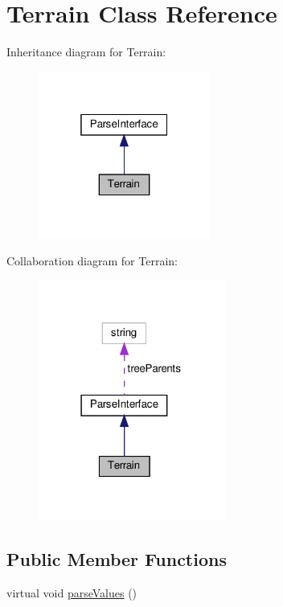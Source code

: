 \hypertarget{classTerrain}{}\section{Terrain Class Reference}
\label{classTerrain}


Inheritance diagram for Terrain\+:
\nopagebreak
\begin{figure}[H]
\begin{center}
\leavevmode
\includegraphics[width=160pt]{classTerrain__inherit__graph}
\end{center}
\end{figure}


Collaboration diagram for Terrain\+:
\nopagebreak
\begin{figure}[H]
\begin{center}
\leavevmode
\includegraphics[width=174pt]{classTerrain__coll__graph}
\end{center}
\end{figure}
\subsection*{Public Member Functions}
\begin{DoxyCompactItemize}
\item 
virtual void \hyperlink{classTerrain_a4258f6f5195a3be6c7afa3e4f03bd227}{parse\+Values} ()
\end{DoxyCompactItemize}
